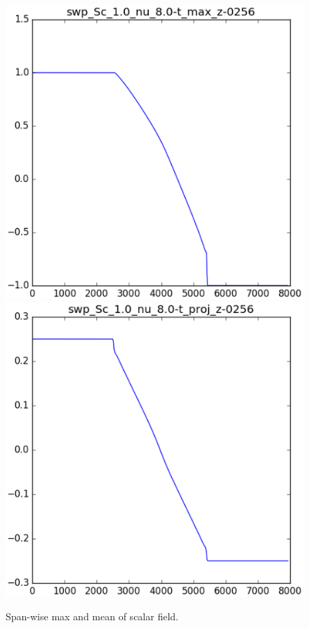 \begin{figure}
\includegraphics[width=\columnwidth]{figs/swp_Sc_1.0_nu_8.0-t_max_z-0256.eps}
\includegraphics[width=\columnwidth]{figs/swp_Sc_1.0_nu_8.0-t_proj_z-0256.eps}
\caption{
  Span-wise max and mean of scalar field.
}
\end{figure}

